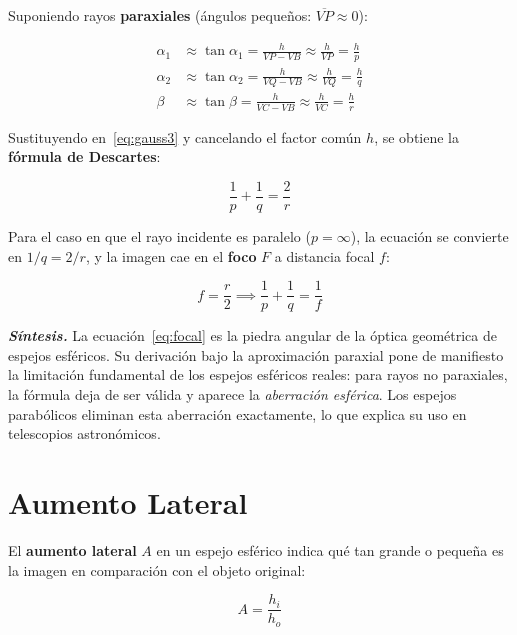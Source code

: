 \documentclass[12pt, a4paper]{article}
\theoremstyle{definition}
\begin{document}
Suponiendo rayos \textbf{paraxiales} (ángulos pequeños: \(\overline{VP} \approx 0\)):

\begin{align}
  \alpha_1 &\approx \tan\alpha_1 = \frac{h}{VP - VB} \approx \frac{h}{VP} = \frac{h}{p} \nonumber \\
  \alpha_2 &\approx \tan\alpha_2 = \frac{h}{VQ - VB} \approx \frac{h}{VQ} = \frac{h}{q} \nonumber \\
  \beta    &\approx \tan\beta    = \frac{h}{VC - VB} \approx \frac{h}{VC} = \frac{h}{r} \nonumber
\end{align}

Sustituyendo en~\eqref{eq:gauss3} y cancelando el factor común \(h\), se obtiene la \textbf{fórmula de Descartes}:

\begin{equation}
  \frac{1}{p} + \frac{1}{q} = \frac{2}{r}
  \label{eq:descartes}
\end{equation}

Para el caso en que el rayo incidente es paralelo (\(p = \infty\)), la ecuación se convierte en \(1/q = 2/r\), y la imagen cae en el \textbf{foco} \(F\) a distancia focal \(f\):

\begin{equation}
  f = \frac{r}{2} \implies \frac{1}{p} + \frac{1}{q} = \frac{1}{f}
  \label{eq:focal}
\end{equation}

\textit{\textbf{Síntesis.}} La ecuación~\eqref{eq:focal} es la piedra angular de la óptica geométrica de espejos esféricos. Su derivación bajo la aproximación paraxial pone de manifiesto la limitación fundamental de los espejos esféricos reales: para rayos no paraxiales, la fórmula deja de ser válida y aparece la \textit{aberración esférica}. Los espejos parabólicos eliminan esta aberración exactamente, lo que explica su uso en telescopios astronómicos.

\section{Aumento Lateral}

El \textbf{aumento lateral} \(A\) en un espejo esférico indica qué tan grande o pequeña es la imagen en comparación con el objeto original:

\begin{equation}
  A = \frac{h_i}{h_o}
  \label{eq:aumento_def}
\end{equation}
\end{document}
